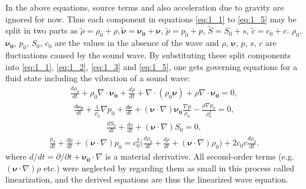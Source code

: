         In the above equations, source terms and also acceleration due to gravity are ignored for now. Thus each component in equations \ref{eq:1_1} to
\ref{eq:1_5} may be split in two parts as $\tilde{\rho}=\rho_0+\rho, \bm{\tilde{\nu}}=\bm{\nu_0}+\bm{\nu}$, $\tilde{p}=p_0+p$, $\tilde{S}=S_0+s$,
$\tilde{c}=c_0+c$. $\rho_0$, $\bm{\nu_0}$, $p_0$, $S_0$, $c_0$ are the values in the absence of the wave and $\rho$, $\bm{\nu}$, $p$, $s$, $c$ are fluctuations
caused by the sound wave.
        By substituting these split components into \ref{eq:1_1}, \ref{eq:1_2}, \ref{eq:1_3} and \ref{eq:1_5}, one gets governing equations for a fluid state
including the vibration of a sound wave:
        \begin{align} \label{eq:1_6}
            \frac{d\rho_0}{dt}+\rho_0\nabla\cdot\bm{\nu_0}+\frac{d\rho}{dt}+\nabla\cdot(\rho_0\bm{\nu})+\rho\nabla\cdot\bm{\nu_0}=0,
        \end{align}
\vspace*{-7mm}
        \begin{align} \label{eq:1_7}
            \frac{d\bm{\nu_0}}{dt}
            +\frac{1}{\rho_0}\nabla p_0
            +\frac{d\bm{\nu}}{dt}
            +(\bm{\nu}\cdot\nabla)\bm{\nu_0}\frac{\nabla p}{\rho_0}
            -\frac{\rho\nabla p_0}{\rho_0^2}=0,
        \end{align}
\vspace*{-7mm}
        \begin{align} \label{eq:1_8}
            \frac{dS_0}{dt}+\frac{ds}{dt}+(\bm{\nu}\cdot\nabla)S_0=0,
        \end{align}
\vspace*{-7mm}
        \begin{align} \label{eq:1_9}
            \frac{p_0}{dt}+\frac{dp}{dt}+(\bm{\nu}\cdot\nabla)p_0=
        c_0^2\biggl( \frac{d\rho_0}{dt}+\frac{d\rho}{dt}+(\bm{\nu}\cdot\nabla)\rho_0\biggr)+2c_0c\frac{d\rho_0}{dt}.
        \end{align}
        where $d/dt=\partial/\partial t+\bm{\nu_0}\cdot\nabla$ is a material derivative. All second-order terms (e.g. $(\bm{\nu}\cdot\nabla)\rho$ etc.) were
neglected by regarding them as small in this process called linearization, and the derived equations are thus the linearized wave equation.


